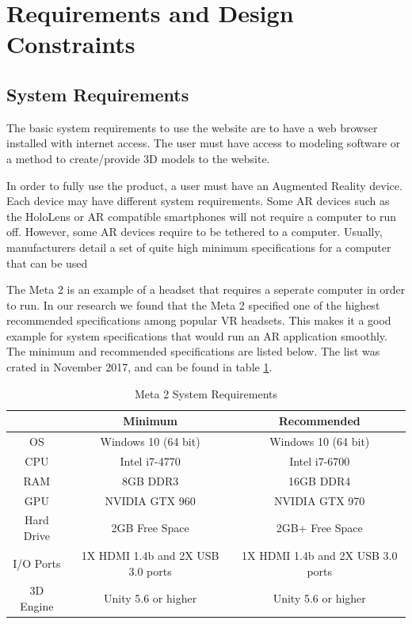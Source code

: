 
\section{Requirements and Design Constraints}


\subsection{System Requirements}

The basic system requirements to use the website are to have a web browser 
installed with internet access.  The user must have access to modeling software 
or a method to create/provide 3D models to the website.

In order to fully use the product, a user must have an Augmented Reality device.
Each device may have different system requirements. Some AR devices such as the 
HoloLens or AR compatible smartphones will not require a computer to run off. 
However, some AR devices require to be tethered to a computer. Usually, 
manufacturers detail a set of quite high minimum specifications for a computer 
that can be used

The Meta 2 is an example of a headset that requires a seperate computer in order
to run.  In our research we found that the Meta 2 specified one of the highest 
recommended specifications among popular VR headsets. This makes it a good 
example for system specifications that would run an AR application smoothly. 
The minimum and recommended specifications are listed below. The list was crated
in November 2017, and can be found in table 
\ref{table:metatwosystemrequirements}.

\begin{table}[H]
	\centering
	\begin{tabular}{ | c | c | c | }
		\hline
		& Minimum & Recommended \\ \hline
		OS & Windows 10 (64 bit) & 	Windows 10 (64 bit) \\ \hline
		CPU & Intel i7-4770 & Intel i7-6700 \\ \hline
		RAM & 8GB DDR3 & 16GB DDR4 \\ \hline
		GPU & NVIDIA GTX 960 & NVIDIA GTX 970 \\ \hline
		Hard Drive & 2GB Free Space & 2GB+ Free Space \\ \hline
		I/O Ports & 1X HDMI 1.4b and 2X USB 3.0 ports & 1X HDMI 1.4b and 2X USB 3.0 ports \\ \hline
		3D Engine & Unity 5.6 or higher & Unity 5.6 or higher \\ \hline
	\end{tabular}

	\caption{Meta 2 System Requirements}
	\label{table:metatwosystemrequirements}
\end{table}

